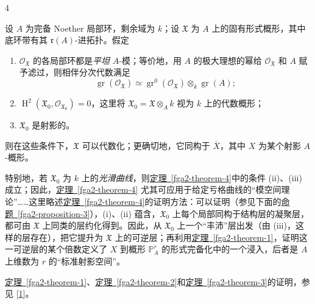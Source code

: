 \begin{theorem}{4}\label{fga2-theorem-4}\skipsinglepar
\par{}设 \(A\) 为完备 Noether 局部环，剩余域为 \(k\)；设 \(\mathfrak {X}\) 为 \(A\) 上的固有形式概形，其中底环带有其 \(\mathfrak {r}(A)\)-进拓扑。假定 
\begin{enumerate}
      
 \item[i.]\(\mathcal {O}_{\mathfrak {X}}\) 的各局部环都是\emph{平坦} \(A\)-模；等价地，用 \(A\) 的极大理想的幂给 \(\mathcal {O}_{\mathfrak {X}}\) 和 \(A\) 赋予滤过，则相伴分次代数满足 \[           \operatorname {gr}(\mathcal {O}_{\mathfrak {X}})           \simeq  \operatorname {gr}^0(\mathcal {O}_{\mathfrak {X}})\otimes _k\operatorname {gr}(A);         \]


      
 \item[ii.]\(\operatorname {H}^2(\mathfrak {X}_0,\mathcal {O}_{\mathfrak {X}_0})=0\)，这里将 \(\mathfrak {X}_0=\mathfrak {X}\otimes _Ak\) 视为 \(k\) 上的代数概形；


      
 \item[iii.]\(\mathfrak {X}_0\) 是射影的。

    \end{enumerate} 则在这些条件下，\(\mathfrak {X}\) 可以代数化；更确切地，它同构于 \(\overline {X}\)，其中 \(X\) 为某个射影 \(A\)-概形。\end{theorem}
\par{}特别地，若 \(\mathfrak {X}_0\) 为 \(k\) 上的\emph{光滑曲线}，则\hyperref[fga2-theorem-4]{定理~\ref*{fga2-theorem-4}}中的条件 (ii)、(iii) 成立；因此，\hyperref[fga2-theorem-4]{定理~\ref*{fga2-theorem-4}} 尤其可应用于给定亏格曲线的“模空间理论”……这里略述\hyperref[fga2-theorem-4]{定理~\ref*{fga2-theorem-4}}的证明方法：可以证明（参见下面的\hyperref[fga2-proposition-3]{命题~\ref*{fga2-proposition-3}}），(i)、(ii) 蕴含，\(\mathfrak {X}_0\) 上每个局部同构于结构层的凝聚层，都可由 \(\mathfrak {X}\) 上同类的层约化得到。因此，从 \(\mathfrak {X}_0\) 上一个“丰沛”层出发（由 (iii)，这样的层存在），把它提升为 \(\mathfrak {X}\) 上的可逆层；再利用\hyperref[fga2-theorem-1]{定理~\ref*{fga2-theorem-1}}，证明这一可逆层的某个倍数定义了 \(X\) 到概形 \(\mathbb {P}_A^r\) 的形式完备化中的一个浸入，后者是 \(A\) 上维数为 \(r\) 的“标准射影空间”。
\par{}\hyperref[fga2-theorem-1]{定理~\ref*{fga2-theorem-1}}、\hyperref[fga2-theorem-2]{定理~\ref*{fga2-theorem-2}}和\hyperref[fga2-theorem-3]{定理~\ref*{fga2-theorem-3}}的证明，参见 [\hyperref[GD1960]{1}]。
